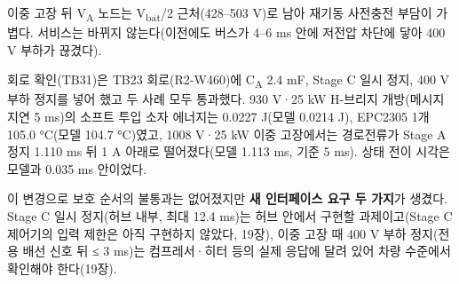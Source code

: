 이중 고장 뒤 V\textsubscript{A} 노드는 V\textsubscript{bat}/2 근처(428–503 V)로 남아 재기동 사전충전 부담이 가볍다. 서비스는 바뀌지 않는다(이전에도 버스가 4–6 ms 안에 저전압 차단에 닿아 400 V 부하가 끊겼다).

회로 확인(TB31)은 TB23 회로(R2-W460)에 C\textsubscript{A} 2.4 mF, Stage C 일시 정지, 400 V 부하 정지를 넣어 했고 두 사례 모두 통과했다. 930 V·25 kW H-브리지 개방(메시지 지연 5 ms)의 소프트 투입 소자 에너지는 0.0227 J(모델 0.0214 J), EPC2305 1개 105.0 °C(모델 104.7 °C)였고, 1008 V·25 kW 이중 고장에서는 경로전류가 Stage A 정지 1.110 ms 뒤 1 A 아래로 떨어졌다(모델 1.113 ms, 기준 5 ms). 상태 전이 시각은 모델과 0.035 ms 안이었다.

이 변경으로 보호 순서의 불통과는 없어졌지만 \textbf{새 인터페이스 요구 두 가지}가 생겼다. Stage C 일시 정지(허브 내부, 최대 12.4 ms)는 허브 안에서 구현할 과제이고(Stage C 제어기의 입력 제한은 아직 구현하지 않았다, 19장), 이중 고장 때 400 V 부하 정지(전용 배선 신호 뒤 ≤ 3 ms)는 컴프레서·히터 등의 실제 응답에 달려 있어 차량 수준에서 확인해야 한다(19장).
